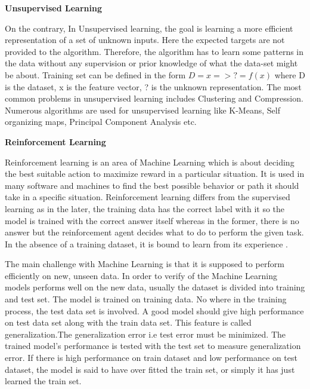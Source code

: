 \noindent \textbf{Unsupervised Learning}
\newline

\noindent On the contrary, In Unsupervised learning, the goal is learning a more efficient representation of a set of unknown inputs. Here the expected targets are not
provided to the algorithm. Therefore, the algorithm has to learn some patterns in the data without any supervision or prior knowledge of what the data-set might be about.  Training set can be defined in the form \( D = {x} => ? = f(x) \) where D is the dataset, x is the feature vector, ? is the unknown representation. The most common problems in unsupervised learning includes Clustering and Compression. Numerous algorithms are used for unsupervised learning like K-Means, Self organizing maps, Principal Component Analysis etc.
\newline

\noindent \textbf{Reinforcement Learning}
\newline

\noindent Reinforcement learning is an area of Machine Learning which is about deciding the best suitable action to maximize reward in a particular situation. It is used in many software and machines to find the best possible behavior or path it should take in a specific situation. Reinforcement learning differs from the supervised learning as in the later, the training data has the correct label with it so the model is trained with the correct answer itself whereas in the former, there is no answer but the reinforcement agent decides what to do to perform the given task. In the absence of a training dataset, it is bound to learn from its experience \cite{geeksforgeeks_2020}.




The main challenge with Machine Learning is that it is supposed to perform efficiently on new, unseen data. In order to verify of the Machine Learning models performs well on the new data, usually the dataset is divided into training and test set. The model is trained on training data. No where in the training process, the test data set is involved. A good model should give high performance on test data set along with the train data set. This feature is called generalization.The generalization error i.e test error must be minimized. The trained model’s performance is tested with the
test set to measure generalization error. If there is high performance on train dataset and low performance on test dataset, the model is said to have over fitted the train set, or simply it has just learned the train set.

